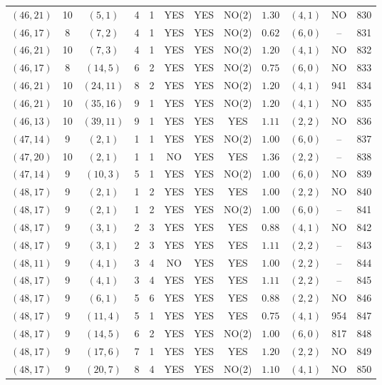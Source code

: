 \begin{longtable}{|c|c|c|c|c|c|c|c|c|c|c|c|}
$(46,21)$ & 10 & $(5,1)$ & 4 & 1 & YES & YES & NO(2) & $1.30$ & $(4,1)$ & NO & 830\\
$(46,17)$ & 8 & $(7,2)$ & 4 & 1 & YES & YES & NO(2) & $0.62$ & $(6,0)$ & -- & 831\\
$(46,21)$ & 10 & $(7,3)$ & 4 & 1 & YES & YES & NO(2) & $1.20$ & $(4,1)$ & NO & 832\\
$(46,17)$ & 8 & $(14,5)$ & 6 & 2 & YES & YES & NO(2) & $0.75$ & $(6,0)$ & NO & 833\\
$(46,21)$ & 10 & $(24,11)$ & 8 & 2 & YES & YES & NO(2) & $1.20$ & $(4,1)$ & 941 & 834\\
$(46,21)$ & 10 & $(35,16)$ & 9 & 1 & YES & YES & NO(2) & $1.20$ & $(4,1)$ & NO & 835\\
$(46,13)$ & 10 & $(39,11)$ & 9 & 1 & YES & YES & YES & $1.11$ & $(2,2)$ & NO & 836\\
$(47,14)$ & 9 & $(2,1)$ & 1 & 1 & YES & YES & NO(2) & $1.00$ & $(6,0)$ & -- & 837\\
$(47,20)$ & 10 & $(2,1)$ & 1 & 1 & NO & YES & YES & $1.36$ & $(2,2)$ & -- & 838\\
$(47,14)$ & 9 & $(10,3)$ & 5 & 1 & YES & YES & NO(2) & $1.00$ & $(6,0)$ & NO & 839\\
$(48,17)$ & 9 & $(2,1)$ & 1 & 2 & YES & YES & YES & $1.00$ & $(2,2)$ & NO & 840\\
$(48,17)$ & 9 & $(2,1)$ & 1 & 2 & YES & YES & NO(2) & $1.00$ & $(6,0)$ & -- & 841\\
$(48,17)$ & 9 & $(3,1)$ & 2 & 3 & YES & YES & YES & $0.88$ & $(4,1)$ & NO & 842\\
$(48,17)$ & 9 & $(3,1)$ & 2 & 3 & YES & YES & YES & $1.11$ & $(2,2)$ & -- & 843\\
$(48,11)$ & 9 & $(4,1)$ & 3 & 4 & NO & YES & YES & $1.00$ & $(2,2)$ & -- & 844\\
$(48,17)$ & 9 & $(4,1)$ & 3 & 4 & YES & YES & YES & $1.11$ & $(2,2)$ & -- & 845\\
$(48,17)$ & 9 & $(6,1)$ & 5 & 6 & YES & YES & YES & $0.88$ & $(2,2)$ & NO & 846\\
$(48,17)$ & 9 & $(11,4)$ & 5 & 1 & YES & YES & YES & $0.75$ & $(4,1)$ & 954 & 847\\
$(48,17)$ & 9 & $(14,5)$ & 6 & 2 & YES & YES & NO(2) & $1.00$ & $(6,0)$ & 817 & 848\\
$(48,17)$ & 9 & $(17,6)$ & 7 & 1 & YES & YES & YES & $1.20$ & $(2,2)$ & NO & 849\\
$(48,17)$ & 9 & $(20,7)$ & 8 & 4 & YES & YES & NO(2) & $1.10$ & $(4,1)$ & NO & 850\\

\end{longtable}
